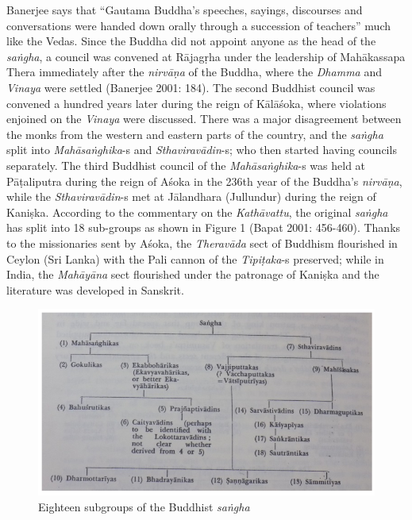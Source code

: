 Banerjee says that “Gautama Buddha’s speeches, sayings, discourses and conversations were handed down orally through a succession of teachers” much like the Vedas. Since the Buddha did not appoint anyone as the head of the \textit{saṅgha}, a council was convened at Rājagṛha under the leadership of Mahākassapa Thera immediately after the \textit{nirvāṇa} of the Buddha, where the \textit{Dhamma} and \textit{Vinaya} were settled (Banerjee 2001: 184). The second Buddhist council was convened a hundred years later during the reign of Kālāśoka, where violations enjoined on the \textit{Vinaya} were discussed. There was a major disagreement between the monks from the western and eastern parts of the country, and the \textit{saṅgha} split into \textit{Mahāsaṅghika}-s and \textit{Sthaviravādin}-s; who then started having councils separately. The third Buddhist council of the \textit{Mahāsaṅghika}-s was held at Pāṭaliputra during the reign of Aśoka in the 236th year of the Buddha’s \textit{nirvāṇa}, while the \textit{Sthaviravādin}-s met at Jālandhara (Jullundur) during the reign of Kaniṣka. According to the commentary on the \textit{Kathāvattu}, the original \textit{saṅgha} has split into 18 sub-groups as shown in Figure 1 (Bapat 2001: 456-460). Thanks to the missionaries sent by Aśoka, the \textit{Theravāda} sect of Buddhism flourished in Ceylon (Sri Lanka) with the Pali cannon of the \textit{Tipiṭaka}-s preserved; while in India, the \textit{Mahāyāna} sect flourished under the patronage of Kaniṣka and the literature was developed in Sanskrit.

\begin{figure}[!h]
\includegraphics[scale=.35]{images/chap5-1.jpg}
\caption{Eighteen subgroups of the Buddhist \textit{saṅgha}}\label{chap5-fig1}
\end{figure}

